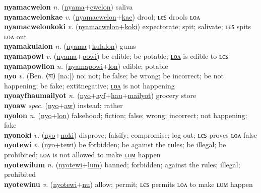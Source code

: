 \textbf{nyamacwelon} \textit{n.} (\hyperref[nyama]{nyama}+\hyperref[cwelon]{cwelon})
saliva \label{nyamacwelon} \\
\textbf{nyamacwelonkae} \textit{v.} (\hyperref[nyamacwelon]{nyamacwelon}+\hyperref[kae]{kae})
drool; ʟєꜱ drools ʟᴏᴧ \label{nyamacwelonkae} \\
\textbf{nyamacwelonkoki} \textit{v.} (\hyperref[nyamacwelon]{nyamacwelon}+\hyperref[koki]{koki})
expectorate; spit; salivate; ʟєꜱ spits ʟᴏᴧ out \label{nyamacwelonkoki} \\
\textbf{nyamakulalon} \textit{n.} (\hyperref[nyama]{nyama}+\hyperref[kulalon]{kulalon})
gums \label{nyamakulalon} \\
\textbf{nyamapowi} \textit{v.} (\hyperref[nyama]{nyama}+\hyperref[powi]{powi})
be edible; be potable; \hyperref[nyamapowilon]{ʟᴏᴧ} is edible to ʟєꜱ \label{nyamapowi} \\
\textbf{nyamapowilon} \textit{n.} (\hyperref[nyamapowi]{nyamapowi}+\hyperref[lon]{lon})
edible; potable \label{nyamapowilon} \\
\textbf{nyo} \textit{v.} (Ben. ⟨না⟩ [naː])
no; not; be false; be wrong; be incorrect; be not happening; be fake; 	extit{negative}; \hyperref[nyolon]{ʟᴏᴧ} is not happening \label{nyo} \\
\textbf{nyoayfhaumailyot} \textit{n.} (\hyperref[nyo]{nyo}+\hyperref[ayf]{ayf}+\hyperref[hau]{hau}+\hyperref[mailyot]{mailyot})
grocery store \label{nyoayfhaumailyot} \\
\textbf{nyoaw} \textit{spec.} (\hyperref[nyo]{nyo}+\hyperref[aw]{aw})
instead; rather \label{nyoaw} \\
\textbf{nyolon} \textit{n.} (\hyperref[nyo]{nyo}+\hyperref[lon]{lon})
falsehood; fiction; false; wrong; incorrect; not happening; fake \label{nyolon} \\
\textbf{nyonoki} \textit{v.} (\hyperref[nyo]{nyo}+\hyperref[noki]{noki})
disprove; falsify; compromise; log out; ʟєꜱ proves ʟᴏᴧ false \label{nyonoki} \\
\textbf{nyotewi} \textit{v.} (\hyperref[nyo]{nyo}+\hyperref[tewi]{tewi})
be forbidden; be against the rules; be illegal; be prohibited; ʟᴏᴧ is not allowed to make \hyperref[nyotewilum]{ʟᴜᴍ} happen \label{nyotewi} \\
\textbf{nyotewilum} \textit{n.} (\hyperref[nyotewi]{nyotewi}+\hyperref[lum]{lum})
banned; forbidden; against the rules; illegal; prohibited \label{nyotewilum} \\
\textbf{nyotewinu} \textit{v.} (\hyperref[nyotewi]{nyotewi}+\hyperref[nu]{nu})
allow; permit; ʟєꜱ permits ʟᴏᴧ to make ʟᴜᴍ happen \label{nyotewinu} \\
